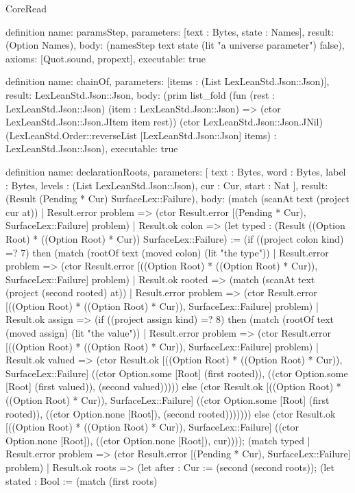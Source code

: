 \begin{lexlean}{CoreRead}
\begin{semanticmodule}
definition{
  name: paramsStep,
  parameters: [text : Bytes, state : Names],
  result: (Option Names),
  body: (namesStep text state (lit "a universe parameter") false),
  axioms: [Quot.sound, propext],
  executable: true
}

definition{
  name: chainOf,
  parameters: [items : (List LexLeanStd.Json::Json)],
  result: LexLeanStd.Json::Json,
  body: (prim list_fold (fun (rest : LexLeanStd.Json::Json) (item : LexLeanStd.Json::Json) => (ctor LexLeanStd.Json::Json.JItem item rest)) (ctor LexLeanStd.Json::Json.JNil) (LexLeanStd.Order::reverseList [LexLeanStd.Json::Json] items) : LexLeanStd.Json::Json),
  executable: true
}

definition{
  name: declarationRoots,
  parameters: [
    text : Bytes,
    word : Bytes,
    label : Bytes,
    levels : (List LexLeanStd.Json::Json),
    cur : Cur,
    start : Nat
  ],
  result: (Result (Pending * Cur) SurfaceLex::Failure),
  body: (match (scanAt text (project cur at))
    | Result.error problem => (ctor Result.error [(Pending * Cur), SurfaceLex::Failure] problem)
    | Result.ok colon => (let typed : (Result ((Option Root) * ((Option Root) * Cur)) SurfaceLex::Failure) := (if ((project colon kind) =? 7) then (match (rootOf text (moved colon) (lit "the type"))
      | Result.error problem => (ctor Result.error [((Option Root) * ((Option Root) * Cur)), SurfaceLex::Failure] problem)
      | Result.ok rooted => (match (scanAt text (project (second rooted) at))
        | Result.error problem => (ctor Result.error [((Option Root) * ((Option Root) * Cur)), SurfaceLex::Failure] problem)
        | Result.ok assign => (if ((project assign kind) =? 8) then (match (rootOf text (moved assign) (lit "the value"))
          | Result.error problem => (ctor Result.error [((Option Root) * ((Option Root) * Cur)), SurfaceLex::Failure] problem)
          | Result.ok valued => (ctor Result.ok [((Option Root) * ((Option Root) * Cur)), SurfaceLex::Failure] ((ctor Option.some [Root] (first rooted)), ((ctor Option.some [Root] (first valued)), (second valued))))) else (ctor Result.ok [((Option Root) * ((Option Root) * Cur)), SurfaceLex::Failure] ((ctor Option.some [Root] (first rooted)), ((ctor Option.none [Root]), (second rooted))))))) else (ctor Result.ok [((Option Root) * ((Option Root) * Cur)), SurfaceLex::Failure] ((ctor Option.none [Root]), ((ctor Option.none [Root]), cur)))); (match typed
      | Result.error problem => (ctor Result.error [(Pending * Cur), SurfaceLex::Failure] problem)
      | Result.ok roots => (let after : Cur := (second (second roots)); (let stated : Bool := (match (first roots)
}
\end{semanticmodule}
\end{lexlean}

